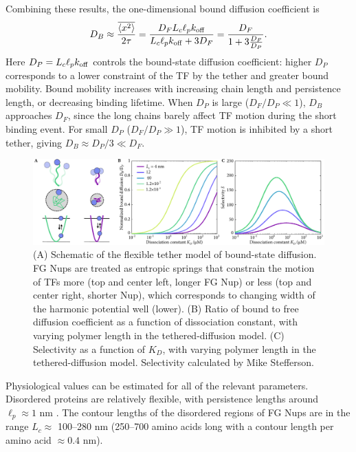 Combining these results, the one-dimensional bound diffusion coefficient is
\begin{equation}\label{eq:dbound}
  D_B \approx \frac{\overline{\langle x^2 \rangle}}{2\tau} = \frac{D_F L_c \ell_p
    k_{\mathrm{off}}}{L_c \ell_p k_{\mathrm{off}} + 3D_F} =
  \frac{D_F}{1+3\frac{D_F}{D_{P}}}.  
\end{equation}
Here $D_P = L_c \ell_p k_{\mathrm{off}}$ controls the bound-state diffusion coefficient: higher $D_P$ corresponds to a lower constraint of the TF by the tether and greater bound mobility. Bound mobility increases with increasing chain length and persistence length, or decreasing binding lifetime. When $D_P$ is large ($D_F/D_P\ll1$), $D_B$ approaches $D_F$, since the long chains barely affect TF motion during the short binding event. For small $D_P$ ($D_F/D_P\gg1$), TF motion is inhibited by a short tether, giving $D_B\approx D_P/3\ll D_F$.  

\begin{figure}
\centering
\includegraphics[width=\textwidth]{figs/ch02/fig3.pdf}
\caption{(A) Schematic of the flexible tether model of bound-state
  diffusion. FG Nups are treated as entropic springs that constrain
  the motion of TFs more (top and center left, longer FG Nup) or less
  (top and center right, shorter Nup), which corresponds to changing
  width of the harmonic potential well (lower).  (B) Ratio of bound to
  free diffusion coefficient as a function of dissociation constant,
  with varying polymer length in the tethered-diffusion model.  (C)
  Selectivity as a function of $K_D$, with varying polymer length in
  the tethered-diffusion model.  Selectivity calculated by Mike Stefferson.}
\label{fig:tethers}
\end{figure}

Physiological values can be estimated for all of the relevant parameters.  Disordered proteins are relatively flexible, with persistence lengths around $\ell_p \approx 1$ nm \cite{receveur-brechot12}.  The contour lengths of the disordered regions of FG Nups are in the range $L_c\approx$ 100--280 nm (250--700 amino acids long \cite{patel07} with a contour length per amino acid $\approx 0.4$ nm).


